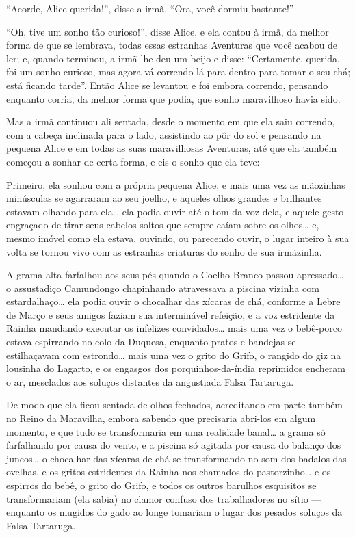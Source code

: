 ``Acorde, Alice querida!'', disse a irmã. ``Ora, você dormiu bastante!''

``Oh, tive um sonho tão curioso!'', disse Alice, e ela contou à irmã, da
melhor forma de que se lembrava, todas essas estranhas Aventuras que você
acabou de ler; e, quando terminou, a irmã lhe deu um beijo e disse:
``Certamente, querida, foi um sonho curioso, mas agora vá correndo lá
para dentro para tomar o seu chá; está ficando tarde''. Então Alice se
levantou e foi embora correndo, pensando enquanto corria, da melhor
forma que podia, que sonho maravilhoso havia sido.

Mas a irmã continuou ali sentada, desde o momento em que ela saiu
correndo, com a cabeça inclinada para o lado, assistindo ao pôr do sol
e pensando na pequena Alice e em todas as suas maravilhosas Aventuras,
até que ela também começou a sonhar de certa forma, e eis o sonho que
ela teve:

Primeiro, ela sonhou com a própria pequena Alice, e mais uma vez as
mãozinhas minúsculas se agarraram ao seu joelho, e aqueles olhos grandes
e brilhantes estavam olhando para ela\ldots{} ela podia ouvir até o tom da
voz dela, e aquele gesto engraçado de tirar seus cabelos soltos que
sempre caíam sobre os olhos\ldots{} e, mesmo imóvel como ela estava, ouvindo,
ou parecendo ouvir, o lugar inteiro à sua volta se tornou vivo com as
estranhas criaturas do sonho de sua irmãzinha.

A grama alta farfalhou aos seus pés quando o Coelho Branco passou
apressado\ldots{} o assustadiço Camundongo chapinhando atravessava a piscina
vizinha com estardalhaço\ldots{} ela podia ouvir o chocalhar das xícaras de
chá, conforme a Lebre de Março e seus amigos faziam sua interminável
refeição, e a voz estridente da Rainha mandando executar os infelizes
convidados\ldots{} mais uma vez o bebê-porco estava espirrando no colo da
Duquesa, enquanto pratos e bandejas se estilhaçavam com estrondo\ldots{} mais
uma vez o grito do Grifo, o rangido do giz na lousinha do Lagarto, e os
engasgos dos porquinhos-da-índia reprimidos encheram o ar, mesclados
aos soluços distantes da angustiada Falsa Tartaruga.

De modo que ela ficou sentada de olhos fechados, acreditando em parte
também no Reino da Maravilha, embora sabendo que precisaria abri-los em
algum momento, e que tudo se transformaria em uma realidade banal\ldots{} a
grama só farfalhando por causa do vento, e a piscina só agitada por
causa do balanço dos juncos\ldots{} o chocalhar das xícaras de chá se
transformando no som dos badalos das ovelhas, e os gritos estridentes da
Rainha nos chamados do pastorzinho\ldots{} e os espirros do bebê, o grito do
Grifo, e todos os outros barulhos esquisitos se transformariam (ela
sabia) no clamor confuso dos trabalhadores no sítio --- enquanto os
mugidos do gado ao longe tomariam o lugar dos pesados soluços da Falsa
Tartaruga.

